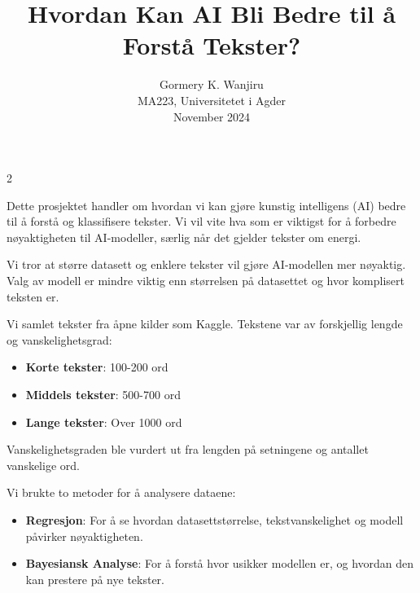 \documentclass[a3paper,12pt]{article}
\title{\textbf{Hvordan Kan AI Bli Bedre til å Forstå Tekster?}}
\author{Gormery K. Wanjiru \\ MA223, Universitetet i Agder \\ November 2024}
\date{}
\begin{document}
\maketitle

\begin{multicols}{2}

\begin{tcolorbox}[colback=blue!5!white, colframe=blue!75!black, title=Bakgrunn]
Dette prosjektet handler om hvordan vi kan gjøre kunstig intelligens (AI) bedre til å forstå og klassifisere tekster. Vi vil vite hva som er viktigst for å forbedre nøyaktigheten til AI-modeller, særlig når det gjelder tekster om energi.
\end{tcolorbox}

\begin{tcolorbox}[colback=green!5!white, colframe=green!75!black, title=Hypotese]
Vi tror at større datasett og enklere tekster vil gjøre AI-modellen mer nøyaktig. Valg av modell er mindre viktig enn størrelsen på datasettet og hvor komplisert teksten er.
\end{tcolorbox}

\begin{tcolorbox}[colback=yellow!5!white, colframe=yellow!75!black, title=Datainnsamling]
Vi samlet tekster fra åpne kilder som Kaggle. Tekstene var av forskjellig lengde og vanskelighetsgrad:
\begin{itemize}
    \item \textbf{Korte tekster}: 100-200 ord
    \item \textbf{Middels tekster}: 500-700 ord
    \item \textbf{Lange tekster}: Over 1000 ord
\end{itemize}
Vanskelighetsgraden ble vurdert ut fra lengden på setningene og antallet vanskelige ord.
\end{tcolorbox}

\begin{tcolorbox}[colback=orange!5!white, colframe=orange!75!black, title=Hva Vi Gjorde]
Vi brukte to metoder for å analysere dataene:
\begin{itemize}
    \item \textbf{Regresjon}: For å se hvordan datasettstørrelse, tekstvanskelighet og modell påvirker nøyaktigheten.
    \item \textbf{Bayesiansk Analyse}: For å forstå hvor usikker modellen er, og hvordan den kan prestere på nye tekster.
\end{itemize}
\end{tcolorbox}


\end{multicols}
\end{document}
